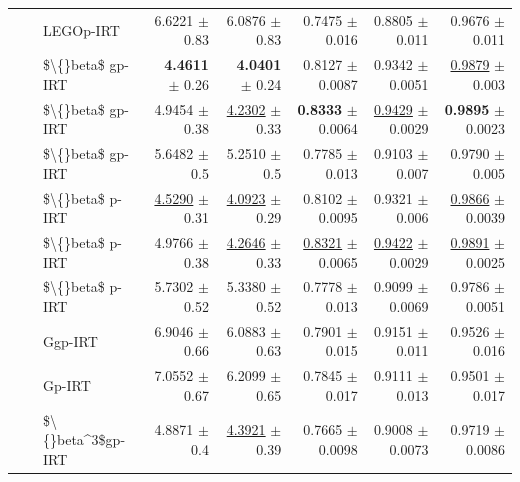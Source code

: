 \begin{longtable}{llp{}rrrrr}
 &  & LEGOp-IRT & 6.6221 {\scriptsize $\pm$ 0.83} & 6.0876 {\scriptsize $\pm$ 0.83} & 0.7475 {\scriptsize $\pm$ 0.016} & 0.8805 {\scriptsize $\pm$ 0.011} & 0.9676 {\scriptsize $\pm$ 0.011} \\
 &  & \$\textbackslash\{\}beta\$ gp-IRT & \textbf{4.4611} {\scriptsize $\pm$ 0.26} & \textbf{4.0401} {\scriptsize $\pm$ 0.24} & 0.8127 {\scriptsize $\pm$ 0.0087} & 0.9342 {\scriptsize $\pm$ 0.0051} & \underline{0.9879} {\scriptsize $\pm$ 0.003} \\
 &  & \$\textbackslash\{\}beta\$ gp-IRT & 4.9454 {\scriptsize $\pm$ 0.38} & \underline{4.2302} {\scriptsize $\pm$ 0.33} & \textbf{0.8333} {\scriptsize $\pm$ 0.0064} & \underline{0.9429} {\scriptsize $\pm$ 0.0029} & \textbf{0.9895} {\scriptsize $\pm$ 0.0023} \\
 &  & \$\textbackslash\{\}beta\$ gp-IRT & 5.6482 {\scriptsize $\pm$ 0.5} & 5.2510 {\scriptsize $\pm$ 0.5} & 0.7785 {\scriptsize $\pm$ 0.013} & 0.9103 {\scriptsize $\pm$ 0.007} & 0.9790 {\scriptsize $\pm$ 0.005} \\
 &  & \$\textbackslash\{\}beta\$ p-IRT & \underline{4.5290} {\scriptsize $\pm$ 0.31} & \underline{4.0923} {\scriptsize $\pm$ 0.29} & 0.8102 {\scriptsize $\pm$ 0.0095} & 0.9321 {\scriptsize $\pm$ 0.006} & \underline{0.9866} {\scriptsize $\pm$ 0.0039} \\
 &  & \$\textbackslash\{\}beta\$ p-IRT & 4.9766 {\scriptsize $\pm$ 0.38} & \underline{4.2646} {\scriptsize $\pm$ 0.33} & \underline{0.8321} {\scriptsize $\pm$ 0.0065} & \underline{0.9422} {\scriptsize $\pm$ 0.0029} & \underline{0.9891} {\scriptsize $\pm$ 0.0025} \\
 &  & \$\textbackslash\{\}beta\$ p-IRT & 5.7302 {\scriptsize $\pm$ 0.52} & 5.3380 {\scriptsize $\pm$ 0.52} & 0.7778 {\scriptsize $\pm$ 0.013} & 0.9099 {\scriptsize $\pm$ 0.0069} & 0.9786 {\scriptsize $\pm$ 0.0051} \\
 &  & Ggp-IRT & 6.9046 {\scriptsize $\pm$ 0.66} & 6.0883 {\scriptsize $\pm$ 0.63} & 0.7901 {\scriptsize $\pm$ 0.015} & 0.9151 {\scriptsize $\pm$ 0.011} & 0.9526 {\scriptsize $\pm$ 0.016} \\
 &  & Gp-IRT & 7.0552 {\scriptsize $\pm$ 0.67} & 6.2099 {\scriptsize $\pm$ 0.65} & 0.7845 {\scriptsize $\pm$ 0.017} & 0.9111 {\scriptsize $\pm$ 0.013} & 0.9501 {\scriptsize $\pm$ 0.017} \\
 &  & \$\textbackslash\{\}beta\textasciicircum{}3\$gp-IRT & 4.8871 {\scriptsize $\pm$ 0.4} & \underline{4.3921} {\scriptsize $\pm$ 0.39} & 0.7665 {\scriptsize $\pm$ 0.0098} & 0.9008 {\scriptsize $\pm$ 0.0073} & 0.9719 {\scriptsize $\pm$ 0.0086} \\

\end{longtable}
